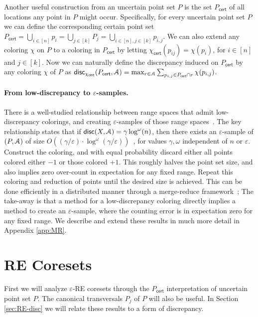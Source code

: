 \documentclass[11pt]{myclass}
\newcommand{\eps}{\varepsilon}
\newcommand{\Eu}[1]{\ensuremath{\EuScript{#1}}}
\newcommand{\disc}{\textsf{disc}}
\newcommand{\cert}{\textsf{cert}}
\newcommand{\RE}{\textsf{RE}\xspace}
\newcommand{\Paragraph}[1]{\paragraph{\sffamily\textbf{#1.}}}
\begin{document}
Another useful construction from an uncertain point set $P$ is the set $P_\cert$ of all locations any point in $P$ might occur.  
Specifically, for every uncertain point set $P$ we can define the corresponding certain point set $P_{\cert} = \bigcup_{i \in [n]} p_i = \bigcup_{j \in [k]} P_j = \bigcup_{i \in [n], j \in [k]} p_{i,j}$. 
We can also extend any coloring $\chi$ on $P$ to a coloring in $P_\cert$ by letting $\chi_\cert(p_{ij}) = \chi(p_i)$, for $i \in [n]$ and $j \in [k]$.  
Now we can naturally define the discrepancy induced on $P_\cert$ by any coloring $\chi$ of $P$ as 
$\disc_{\chi_\cert} (P_\cert, \Eu{A}) = \max_{r \in \Eu{A}} \sum_{p_{i,j} \in P_\cert \cap r} \chi(p_{i,j})$.

\Paragraph{From low-discrepancy to $\eps$-samples}
There is a well-studied relationship between range spaces that admit low-discrepancy colorings, and creating $\eps$-samples of those range spaces~\cite{CM96,Mat99,Cha01,Bec81a}.  The key relationship states that if $\disc(X,\Eu{A}) = \gamma \log^{\omega}(n)$, then there exists an $\eps$-sample of $(P,\Eu{A})$ of size $O((\gamma/\eps) \cdot \log^\omega(\gamma/\eps))$~\cite{Phi08}, for values $\gamma, \omega$ independent of $n$ or $\eps$.  
Construct the coloring, and with equal probability discard either all points colored 
either $-1$ or those colored $+1$.  This roughly halves the point set size, and also implies zero over-count in expectation for any fixed range.  Repeat this coloring and reduction of points until the desired size is achieved.  This can be done efficiently in a distributed manner through a merge-reduce framework~\cite{CM96};   
The take-away is that a method for a low-discrepancy coloring directly implies a method to create an $\eps$-sample, where the counting error is in expectation zero for any fixed range.  
We describe and extend these results in much more detail in Appendix \ref{app:MR}.  

\section{\RE Coresets}\label{sec:rec}
First we will analyze $\eps$-\RE coresets through the $P_\cert$ interpretation of uncertain point set $P$.  The canonical transversals $P_j$ of $P$ will also be useful.  In Section \ref{sec:RE-disc} we will relate these results to a form of discrepancy.  
\end{document}
